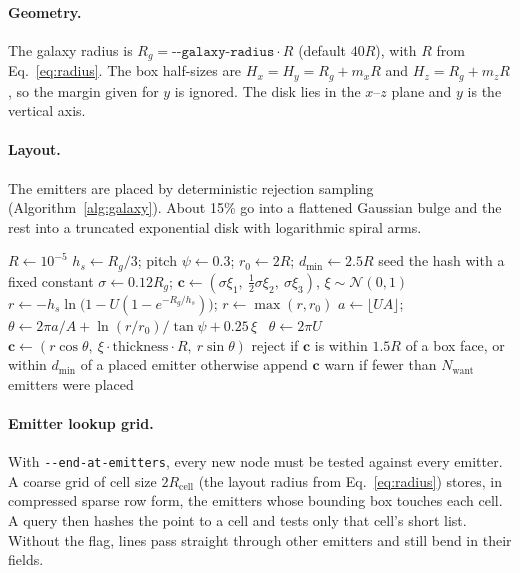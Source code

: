 \documentclass[12pt]{article}
\newcommand{\opt}[1]{\texttt{-{}-#1}}
\newcommand{\vect}[1]{\mathbf{#1}}
\begin{document}
\paragraph{Geometry.}
The galaxy radius is $R_g = \opt{galaxy-radius}\cdot R$ (default $40R$), with
$R$ from Eq.~\eqref{eq:radius}. The box half-sizes are $H_x=H_y=R_g+m_xR$ and
$H_z=R_g+m_zR$, so the margin given for $y$ is ignored. The disk lies in the
$x$--$z$ plane and $y$ is the vertical axis.

\paragraph{Layout.}
The emitters are placed by deterministic rejection sampling
(Algorithm~\ref{alg:galaxy}). About 15\% go into a flattened Gaussian bulge and the rest into
a truncated exponential disk with logarithmic spiral arms.

\begin{algorithm}[htbp]
\caption{\textsc{BuildGalaxy} --- deterministic spiral layout}
\label{alg:galaxy}
\begin{algorithmic}[1]
\State $R\gets10^{-5}$ 
\State $h_s\gets R_g/3$; \quad pitch $\psi\gets0.3$; \quad $r_0\gets2R$; \quad $d_\text{min}\gets2.5R$
\State seed the hash with a fixed constant
    
      \State $\sigma\gets0.12R_g$; \quad $\vect c\gets(\sigma\xi_1,\ \tfrac12\sigma\xi_2,\ \sigma\xi_3)$, $\xi\sim\mathcal N(0,1)$
   \Else {}
      \State $r\gets -h_s\ln\!\big(1-U(1-e^{-R_g/h_s})\big)$; \quad $r\gets\max(r,r_0)$ 
         \State $a\gets\lfloor UA\rfloor$; \quad $\theta\gets 2\pi a/A+\ln(r/r_0)/\tan\psi+0.25\,\xi$
      \Else\ $\theta\gets2\pi U$
      \EndIf
      \State $\vect c\gets(r\cos\theta,\ \xi\cdot\text{thickness}\cdot R,\ r\sin\theta)$
   \EndIf
   \State reject if $\vect c$ is within $1.5R$ of a box face, or within $d_\text{min}$ of a placed emitter
   \State otherwise append $\vect c$
\EndWhile
\State warn if fewer than $N_\text{want}$ emitters were placed
\end{algorithmic}
\end{algorithm}

\paragraph{Emitter lookup grid.}
With \opt{end-at-emitters}, every new node must be tested against every
emitter. A coarse grid of cell size $2R_\text{cell}$ (the layout radius from
Eq.~\eqref{eq:radius}) stores, in compressed sparse row form, the emitters whose bounding
box touches each cell. A query then hashes the point to a cell and tests only
that cell's short list. Without the flag, lines pass straight through other
emitters and still bend in their fields.
\end{document}
